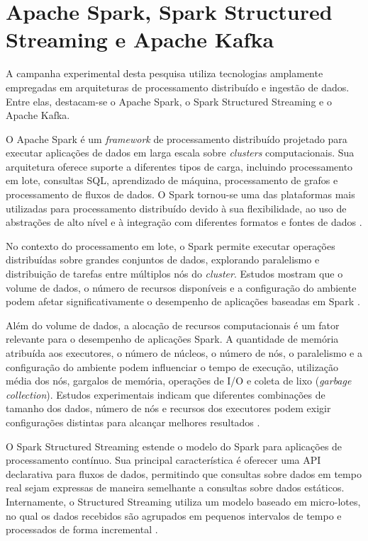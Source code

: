 \section{Apache Spark, Spark Structured Streaming e Apache Kafka}
\label{sec:tecnologias}

A campanha experimental desta pesquisa utiliza tecnologias amplamente empregadas em arquiteturas de processamento distribuído e ingestão de dados. Entre elas, destacam-se o Apache Spark, o Spark Structured Streaming e o Apache Kafka.

O Apache Spark é um \textit{framework} de processamento distribuído projetado para executar aplicações de dados em larga escala sobre \textit{clusters} computacionais. Sua arquitetura oferece suporte a diferentes tipos de carga, incluindo processamento em lote, consultas SQL, aprendizado de máquina, processamento de grafos e processamento de fluxos de dados. O Spark tornou-se uma das plataformas mais utilizadas para processamento distribuído devido à sua flexibilidade, ao uso de abstrações de alto nível e à integração com diferentes formatos e fontes de dados \cite{zaharia2016apache,shanahan2015large}.

No contexto do processamento em lote, o Spark permite executar operações distribuídas sobre grandes conjuntos de dados, explorando paralelismo e distribuição de tarefas entre múltiplos nós do \textit{cluster}. Estudos mostram que o volume de dados, o número de recursos disponíveis e a configuração do ambiente podem afetar significativamente o desempenho de aplicações baseadas em Spark \cite{awan2015data,ahmed2020comprehensive}.

Além do volume de dados, a alocação de recursos computacionais é um fator relevante para o desempenho de aplicações Spark. A quantidade de memória atribuída aos executores, o número de núcleos, o número de nós, o paralelismo e a configuração do ambiente podem influenciar o tempo de execução, utilização média dos nós, gargalos de memória, operações de I/O e coleta de lixo (\textit{garbage collection}). Estudos experimentais indicam que diferentes combinações de tamanho dos dados, número de nós e recursos dos executores podem exigir configurações distintas para alcançar melhores resultados \cite{alcantara2019performance,shyamasundar2019fine}.

O Spark Structured Streaming estende o modelo do Spark para aplicações de processamento contínuo. Sua principal característica é oferecer uma API declarativa para fluxos de dados, permitindo que consultas sobre dados em tempo real sejam expressas de maneira semelhante a consultas sobre dados estáticos. Internamente, o Structured Streaming utiliza um modelo baseado em micro-lotes, no qual os dados recebidos são agrupados em pequenos intervalos de tempo e processados de forma incremental \cite{armbrust2018structured}.


